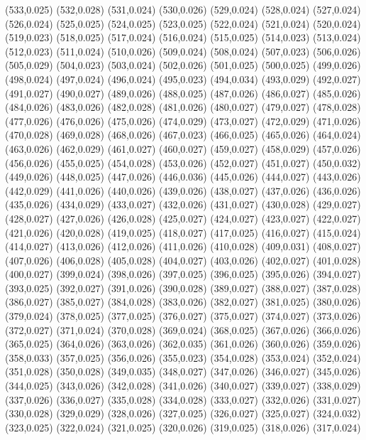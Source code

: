 (533,0.025)
(532,0.028)
(531,0.024)
(530,0.026)
(529,0.024)
(528,0.024)
(527,0.024)
(526,0.024)
(525,0.025)
(524,0.025)
(523,0.025)
(522,0.024)
(521,0.024)
(520,0.024)
(519,0.023)
(518,0.025)
(517,0.024)
(516,0.024)
(515,0.025)
(514,0.023)
(513,0.024)
(512,0.023)
(511,0.024)
(510,0.026)
(509,0.024)
(508,0.024)
(507,0.023)
(506,0.026)
(505,0.029)
(504,0.023)
(503,0.024)
(502,0.026)
(501,0.025)
(500,0.025)
(499,0.026)
(498,0.024)
(497,0.024)
(496,0.024)
(495,0.023)
(494,0.034)
(493,0.029)
(492,0.027)
(491,0.027)
(490,0.027)
(489,0.026)
(488,0.025)
(487,0.026)
(486,0.027)
(485,0.026)
(484,0.026)
(483,0.026)
(482,0.028)
(481,0.026)
(480,0.027)
(479,0.027)
(478,0.028)
(477,0.026)
(476,0.026)
(475,0.026)
(474,0.029)
(473,0.027)
(472,0.029)
(471,0.026)
(470,0.028)
(469,0.028)
(468,0.026)
(467,0.023)
(466,0.025)
(465,0.026)
(464,0.024)
(463,0.026)
(462,0.029)
(461,0.027)
(460,0.027)
(459,0.027)
(458,0.029)
(457,0.026)
(456,0.026)
(455,0.025)
(454,0.028)
(453,0.026)
(452,0.027)
(451,0.027)
(450,0.032)
(449,0.026)
(448,0.025)
(447,0.026)
(446,0.036)
(445,0.026)
(444,0.027)
(443,0.026)
(442,0.029)
(441,0.026)
(440,0.026)
(439,0.026)
(438,0.027)
(437,0.026)
(436,0.026)
(435,0.026)
(434,0.029)
(433,0.027)
(432,0.026)
(431,0.027)
(430,0.028)
(429,0.027)
(428,0.027)
(427,0.026)
(426,0.028)
(425,0.027)
(424,0.027)
(423,0.027)
(422,0.027)
(421,0.026)
(420,0.028)
(419,0.025)
(418,0.027)
(417,0.025)
(416,0.027)
(415,0.024)
(414,0.027)
(413,0.026)
(412,0.026)
(411,0.026)
(410,0.028)
(409,0.031)
(408,0.027)
(407,0.026)
(406,0.028)
(405,0.028)
(404,0.027)
(403,0.026)
(402,0.027)
(401,0.028)
(400,0.027)
(399,0.024)
(398,0.026)
(397,0.025)
(396,0.025)
(395,0.026)
(394,0.027)
(393,0.025)
(392,0.027)
(391,0.026)
(390,0.028)
(389,0.027)
(388,0.027)
(387,0.028)
(386,0.027)
(385,0.027)
(384,0.028)
(383,0.026)
(382,0.027)
(381,0.025)
(380,0.026)
(379,0.024)
(378,0.025)
(377,0.025)
(376,0.027)
(375,0.027)
(374,0.027)
(373,0.026)
(372,0.027)
(371,0.024)
(370,0.028)
(369,0.024)
(368,0.025)
(367,0.026)
(366,0.026)
(365,0.025)
(364,0.026)
(363,0.026)
(362,0.035)
(361,0.026)
(360,0.026)
(359,0.026)
(358,0.033)
(357,0.025)
(356,0.026)
(355,0.023)
(354,0.028)
(353,0.024)
(352,0.024)
(351,0.028)
(350,0.028)
(349,0.035)
(348,0.027)
(347,0.026)
(346,0.027)
(345,0.026)
(344,0.025)
(343,0.026)
(342,0.028)
(341,0.026)
(340,0.027)
(339,0.027)
(338,0.029)
(337,0.026)
(336,0.027)
(335,0.028)
(334,0.028)
(333,0.027)
(332,0.026)
(331,0.027)
(330,0.028)
(329,0.029)
(328,0.026)
(327,0.025)
(326,0.027)
(325,0.027)
(324,0.032)
(323,0.025)
(322,0.024)
(321,0.025)
(320,0.026)
(319,0.025)
(318,0.026)
(317,0.024)
